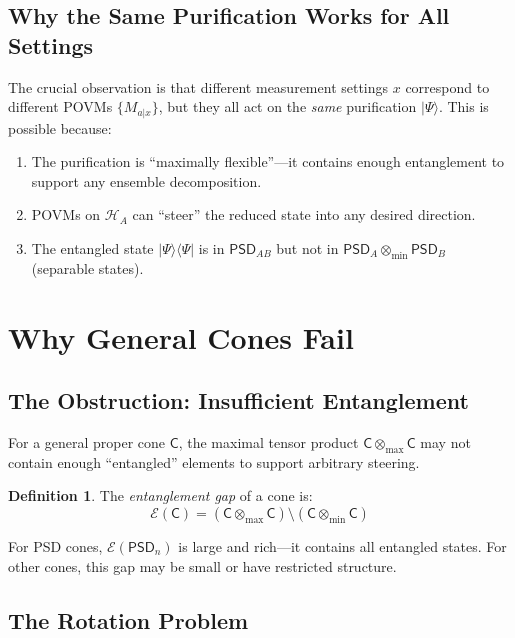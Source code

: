 \documentclass[11pt,a4paper]{article}
\theoremstyle{definition}
\newtheorem{definition}[theorem]{Definition}
\newcommand{\C}{\mathsf{C}}
\newcommand{\tmin}{\otimes_{\min}}
\newcommand{\tmax}{\otimes_{\max}}
\newcommand{\Hilb}{\mathcal{H}}
\newcommand{\PSD}{\mathsf{PSD}}
\begin{document}
\subsection{Why the Same Purification Works for All Settings}

The crucial observation is that different measurement settings $x$ correspond to different POVMs $\{M_{a|x}\}$, but they all act on the \emph{same} purification $|\Psi\rangle$. This is possible because:

\begin{enumerate}
    \item The purification is ``maximally flexible''---it contains enough entanglement to support any ensemble decomposition.

    \item POVMs on $\Hilb_A$ can ``steer'' the reduced state into any desired direction.

    \item The entangled state $|\Psi\rangle\langle\Psi|$ is in $\PSD_{AB}$ but not in $\PSD_A \tmin \PSD_B$ (separable states).
\end{enumerate}

\section{Why General Cones Fail}

\subsection{The Obstruction: Insufficient Entanglement}

For a general proper cone $\C$, the maximal tensor product $\C \tmax \C$ may not contain enough ``entangled'' elements to support arbitrary steering.

\begin{definition}
The \emph{entanglement gap} of a cone is:
\[
\mathcal{E}(\C) = (\C \tmax \C) \setminus (\C \tmin \C)
\]
\end{definition}

For PSD cones, $\mathcal{E}(\PSD_n)$ is large and rich---it contains all entangled states. For other cones, this gap may be small or have restricted structure.

\subsection{The Rotation Problem}
\end{document}

